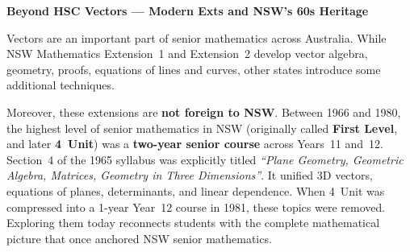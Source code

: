 
\noindent{}

\vspace{1em}

\noindent\textbf{\large Beyond HSC Vectors --- Modern Exts and NSW's 60s Heritage}

\vspace{0.5em}

\noindent
Vectors are an important part of senior mathematics across Australia.
While NSW Mathematics Extension~1 and Extension~2 develop vector algebra,
geometry, proofs, equations of lines and curves, other states introduce
some additional techniques.

Moreover, these extensions are \textbf{not foreign to NSW}. Between 1966 and 1980, the highest level of senior mathematics in NSW (originally called \textbf{First Level}, and later \textbf{4~Unit}) was a \textbf{two-year senior course} across Years~11 and~12. Section~4 of the 1965 syllabus was explicitly titled \emph{``Plane Geometry, Geometric Algebra, Matrices, Geometry in Three Dimensions''}. It unified 3D vectors, equations of planes, determinants, and linear dependence. When 4~Unit was compressed into a 1-year Year~12 course in 1981, these topics were removed. Exploring them today reconnects students with the complete mathematical picture that once anchored NSW senior mathematics.

